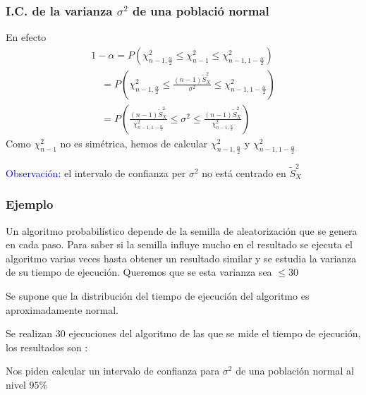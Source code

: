 \documentclass[12pt,t]{beamer}
\newcommand{\blue}[1]{\textcolor{blue}{#1}}
\renewcommand{\leq}{\leqslant}
\theoremstyle{plain}
\theoremstyle{definition}
\begin{document}
\begin{frame}
\frametitle{I.C. de la varianza $\sigma^2$ de una població normal}

En efecto
$$
\begin{array}{l}
1-\alpha=P\left(\chi_{n-1,\frac{\alpha}{2}}^2\leq \chi_{n-1}^2\leq
\chi_{n-1,1-\frac{\alpha}{2}}^2\right)\\[2ex]
\quad\displaystyle =P\left(\chi_{n-1,\frac{\alpha}{2}}^2\leq \frac{(n-1) \widetilde{S}_{X}^2}{\sigma^2}\leq
\chi_{n-1,1-\frac{\alpha}{2}}^2
\right)\\[2ex]
\quad\displaystyle = P\left(\frac{(n-1)
\widetilde{S}_{X}^2}{\chi_{n-1,1-\frac{\alpha}{2}}^2}\leq\sigma^2\leq\frac{
(n-1)\widetilde{S}_{X}^2}{\chi_{n-1,\frac{\alpha}{2}}^2}
\right)
\end{array}
$$
Como $\chi_{n-1}^2$ no es simétrica, hemos de calcular $\chi_{n-1,\frac{\alpha}{2}}^2$ y $\chi_{n-1,1-\frac{\alpha}{2}}^2$
\medskip

\blue{Observación:} el intervalo de confianza  per $\sigma^2$ no está
centrado   en $\widetilde{S}_{X}^2$

\end{frame}


\begin{frame}
\frametitle{Ejemplo}

Un algoritmo probabilístico depende de la semilla de aleatorización
que se genera en cada paso. 
Para saber  si la semilla influye mucho en el resultado se ejecuta el 
algoritmo varias veces  hasta obtener un resultado similar y 
se estudia la varianza de su tiempo de ejecución. Queremos que se esta varianza sea $\leq 30$ 

Se supone  que la distribución del tiempo de ejecución del algoritmo  es 
aproximadamente normal. 
\medskip

Se realizan 30  ejecuciones del algoritmo de las que se mide el tiempo
de ejecución, los resultados son :
\medskip


Nos piden calcular un intervalo de confianza   para $\sigma^2$ de una población normal al nivel
$95\%$
\end{frame}
\end{document}
